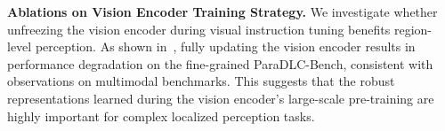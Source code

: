 \documentclass{llmxive}
\providecommand{\arraystretch}{1.3}
\begin{document}
\begin{table}[htbp]
\centering
\label{tab:vision_encoder_ablation}
\setlength{\tabcolsep}{6pt}
\renewcommand{\arraystretch}{1.15}
\caption{Ablations on the training strategy of the vision encoder in PerceptionDLM. Freezing the vision encoder performs better, and is thus used as the default baseline setting.}
\end{table}

\noindent
\textbf{Ablations on Vision Encoder Training Strategy.}
We investigate whether unfreezing the vision encoder during visual instruction tuning benefits region-level perception. As shown in~, fully updating the vision encoder results in performance degradation on the fine-grained ParaDLC-Bench, consistent with observations on multimodal benchmarks. This suggests that the robust representations learned during the vision encoder's large-scale pre-training are highly important for complex localized perception tasks.

% 
\end{document}
